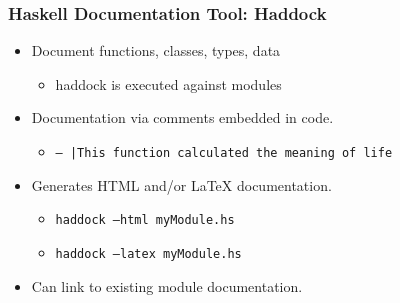 \begin{frame}
  \frametitle{Haskell Documentation Tool: Haddock}
  \begin{itemize}
    \item Document functions, classes, types, data
      \begin{itemize}
        \item haddock is executed against modules
      \end{itemize}
    \item Documentation via comments embedded in code.
      \begin{itemize}
        \item \texttt{-- |This function calculated the meaning of life}
      \end{itemize}
    \item Generates HTML and/or LaTeX documentation.
      \begin{itemize}
        \item \texttt{haddock --html myModule.hs}
        \item \texttt{haddock --latex myModule.hs}
      \end{itemize}
    \item Can link to existing module documentation.  
  \end{itemize}
\end{frame}